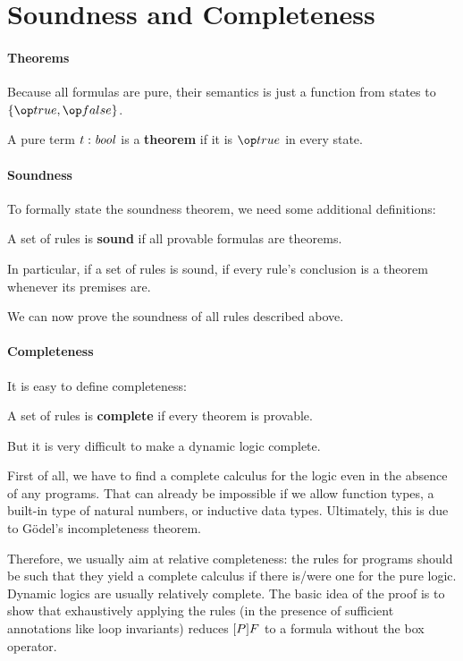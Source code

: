 \section{Soundness and Completeness}

\paragraph{Theorems}
Because all formulas are pure, their semantics is just a function from states to $\{\true,\false\}$.

\begin{definition}[Theorem]
A pure term $t:\mathit{bool}$ is a \textbf{theorem} if it is $\true$ in every state.
\end{definition}


\paragraph{Soundness}
To formally state the soundness theorem, we need some additional definitions:

\begin{definition}[Soundness]
A set of rules is \textbf{sound} if all provable formulas are theorems.
\end{definition}

In particular, if a set of rules is sound, if every rule's conclusion is a theorem whenever its premises are.

We can now prove the soundness of all rules described above.

\paragraph{Completeness}

It is easy to define completeness:

\begin{definition}[Completeness]
A set of rules is \textbf{complete} if every theorem is provable.
\end{definition}

But it is very difficult to make a dynamic logic complete.

First of all, we have to find a complete calculus for the logic even in the absence of any programs.
That can already be impossible if we allow function types, a built-in type of natural numbers, or inductive data types.
Ultimately, this is due to G\"odel's incompleteness theorem.

Therefore, we usually aim at relative completeness: the rules for programs should be such that they yield a complete calculus if there is/were one for the pure logic.
Dynamic logics are usually relatively complete.
The basic idea of the proof is to show that exhaustively applying the rules (in the presence of sufficient annotations like loop invariants) reduces $[P]F$ to a formula without the box operator.


